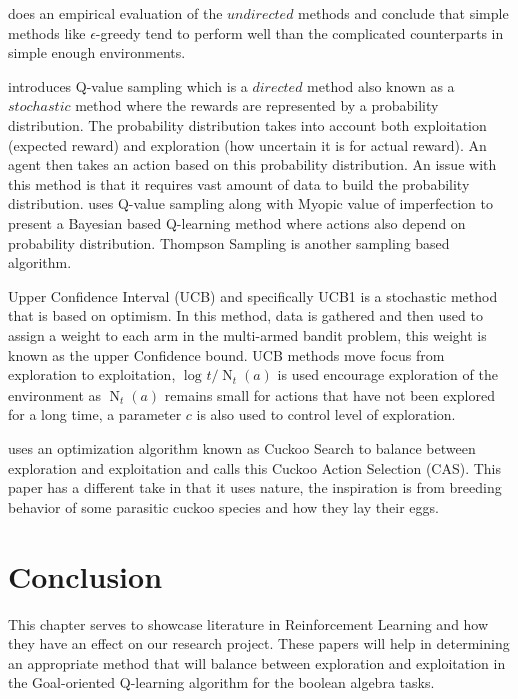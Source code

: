 \documentclass[11pt]{report}
\begin{document}
\citet*{vermorel2005multi} does an empirical evaluation of the $undirected$ methods and conclude that simple methods 
like $\epsilon$-greedy tend to perform well than the complicated counterparts in simple enough environments.

\citet*{wyatt1998exploration} introduces Q-value sampling which is a $directed$ method also known as a $stochastic$
method where the rewards are represented by a probability distribution. The probability distribution takes into account 
both exploitation (expected reward) and exploration (how uncertain it is for actual reward). An agent then takes an 
action based on this probability distribution. An issue with this method is that it requires vast amount of data to 
build the probability distribution. \citet*{dearden1998bayesian} uses Q-value sampling along with Myopic value of 
imperfection \citet*{howard1966information} to present a Bayesian based Q-learning method where actions also depend on 
probability distribution. Thompson Sampling \citep*{thompson1933likelihood} is another sampling based algorithm.

Upper Confidence Interval (UCB) and specifically UCB1 \citep*{auer2002finite} is a stochastic method that is based on 
optimism. In this method, data is gathered and then used to assign a weight to each arm in the multi-armed bandit 
problem, this weight is known as the upper Confidence bound. UCB methods move focus from exploration to exploitation, 
$\log_{}{t} / \operatorname{N}_t(a)$ is used encourage exploration of the environment as $\operatorname{N}_t(a)$ remains
small for actions that have not been explored for a long time, a parameter $c$ is also used to control level of 
exploration.

\citet*{abed2018action} uses an optimization algorithm known as Cuckoo Search \citep*{yang2009cuckoo} to balance between exploration and 
exploitation and calls this Cuckoo Action Selection (CAS). This paper has a different take in that it uses nature, the 
inspiration is from breeding behavior of some parasitic cuckoo species and how they lay their eggs.

\section{Conclusion} \label{conclusion}
This chapter serves to showcase literature in Reinforcement Learning and how they have an effect on our research project.
These papers will help in determining an appropriate method that will balance between exploration and exploitation in 
the Goal-oriented Q-learning algorithm for the boolean algebra tasks.




\end{document}
